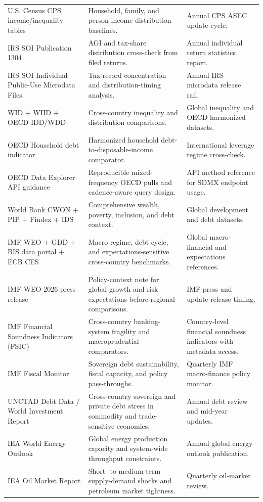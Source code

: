 \documentclass[11pt,openany]{book}
\begin{document}
\begin{longtable}{>{\raggedright\arraybackslash}p{}p{}p{}}
U.S. Census CPS income/inequality tables & Household, family, and person income distribution baselines. & Annual CPS ASEC update cycle. \\
IRS SOI Publication 1304 & AGI and tax-share distribution cross-check from filed returns. & Annual individual return statistics report. \\
IRS SOI Individual Public-Use Microdata Files & Tax-record concentration and distribution-timing analysis. & Annual IRS microdata release rail. \\
WID + WIID + OECD IDD/WDD & Cross-country inequality and distribution comparisons. & Global inequality and OECD harmonized datasets. \\
OECD Household debt indicator & Harmonized household debt-to-disposable-income comparator. & International leverage regime cross-check. \\
OECD Data Explorer API guidance & Reproducible mixed-frequency OECD pulls and cadence-aware query design. & API method reference for SDMX endpoint usage. \\
World Bank CWON + PIP + Findex + IDS & Comprehensive wealth, poverty, inclusion, and debt context. & Global development and debt datasets. \\
IMF WEO + GDD + BIS data portal + ECB CES & Macro regime, debt cycle, and expectations-sensitive cross-country benchmarks. & Global macro-financial and expectations references. \\
IMF WEO 2026 press release & Policy-context note for global growth and risk expectations before regional comparisons. & IMF press and update release timing. \\
IMF Financial Soundness Indicators (FSIC) & Cross-country banking-system fragility and macroprudential comparators. & Country-level financial soundness indicators with metadata access. \\
IMF Fiscal Monitor & Sovereign debt sustainability, fiscal capacity, and policy pass-throughs. & Quarterly IMF macro-finance policy monitor. \\
UNCTAD Debt Data / World Investment Report & Cross-country sovereign and private debt stress in commodity and trade-sensitive economies. & Annual debt review and mid-year updates. \\
IEA World Energy Outlook & Global energy production capacity and system-wide throughput constraints. & Annual global energy outlook publication. \\
IEA Oil Market Report & Short- to medium-term supply-demand shocks and petroleum market tightness. & Quarterly oil-market review. \\

\end{longtable}
\end{document}
